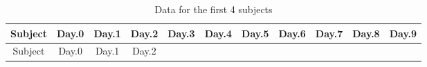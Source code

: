 \documentclass[]{article}
\begin{document}
\begin{longtable}[]{@{}ccccccccccc@{}}
\caption{Data for the first 4 subjects}\tabularnewline
\toprule
\begin{minipage}[b]{0.08\columnwidth}\centering
Subject\strut
\end{minipage} & \begin{minipage}[b]{0.06\columnwidth}\centering
Day.0\strut
\end{minipage} & \begin{minipage}[b]{0.06\columnwidth}\centering
Day.1\strut
\end{minipage} & \begin{minipage}[b]{0.06\columnwidth}\centering
Day.2\strut
\end{minipage} & \begin{minipage}[b]{0.06\columnwidth}\centering
Day.3\strut
\end{minipage} & \begin{minipage}[b]{0.06\columnwidth}\centering
Day.4\strut
\end{minipage} & \begin{minipage}[b]{0.06\columnwidth}\centering
Day.5\strut
\end{minipage} & \begin{minipage}[b]{0.06\columnwidth}\centering
Day.6\strut
\end{minipage} & \begin{minipage}[b]{0.06\columnwidth}\centering
Day.7\strut
\end{minipage} & \begin{minipage}[b]{0.06\columnwidth}\centering
Day.8\strut
\end{minipage} & \begin{minipage}[b]{0.06\columnwidth}\centering
Day.9\strut
\end{minipage}\tabularnewline
\midrule
\endfirsthead
\toprule
\begin{minipage}[b]{0.08\columnwidth}\centering
Subject\strut
\end{minipage} & \begin{minipage}[b]{0.06\columnwidth}\centering
Day.0\strut
\end{minipage} & \begin{minipage}[b]{0.06\columnwidth}\centering
Day.1\strut
\end{minipage} & \begin{minipage}[b]{0.06\columnwidth}\centering
Day.2\strut
\end{minipage} & \begin{minipage}[b]{0.06\columnwidth}\centering

\end{minipage}
\end{longtable}
\end{document}
